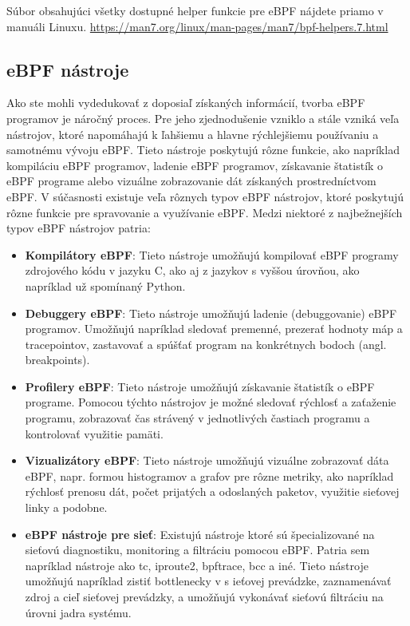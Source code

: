 Súbor obsahujúci všetky dostupné helper funkcie pre eBPF nájdete priamo v manuáli Linuxu. 
\url{https://man7.org/linux/man-pages/man7/bpf-helpers.7.html}

\subsection{eBPF nástroje}
Ako ste mohli vydedukovať z doposiaľ získaných informácií, tvorba eBPF programov je náročný proces. Pre jeho zjednodušenie vzniklo a 
stále vzniká veľa nástrojov, ktoré napomáhajú k ľahšiemu a hlavne rýchlejšiemu používaniu a samotnému vývoju eBPF. 
Tieto nástroje poskytujú rôzne funkcie, ako napríklad kompiláciu eBPF programov, ladenie eBPF programov, získavanie štatistík o eBPF 
programe alebo vizuálne zobrazovanie dát získaných prostredníctvom  eBPF. V súčasnosti existuje veľa rôznych typov eBPF nástrojov, 
ktoré poskytujú rôzne funkcie pre spravovanie a využívanie eBPF. 
Medzi niektoré z najbežnejších typov eBPF nástrojov patria:
\begin{itemize}
    \item \textbf{Kompilátory eBPF}: Tieto nástroje umožňujú kompilovať eBPF programy zdrojového kódu v jazyku C, ako aj z jazykov s vyššou úrovňou, 
    ako napríklad už spomínaný  Python.
    \item \textbf{Debuggery eBPF}: Tieto nástroje umožňujú ladenie (debuggovanie) eBPF programov. Umožňujú napríklad sledovať premenné, 
    prezerať hodnoty máp a tracepointov, zastavovať a spúšťať program na konkrétnych bodoch (angl. breakpoints).
    \item \textbf{Profilery eBPF}: Tieto nástroje umožňujú získavanie štatistík o eBPF programe. Pomocou týchto nástrojov je možné sledovať rýchlosť a 
    zaťaženie programu, zobrazovať čas strávený v jednotlivých častiach programu a kontrolovať využitie pamäti.
    \item \textbf{Vizualizátory eBPF}: Tieto nástroje umožňujú vizuálne zobrazovať dáta eBPF, napr. formou histogramov a grafov pre rôzne metriky, 
    ako napríklad rýchlosť prenosu dát, počet prijatých a odoslaných paketov, využitie sieťovej linky a podobne.
    \item \textbf{eBPF nástroje pre sieť}: Existujú nástroje ktoré sú špecializované na sieťovú diagnostiku, monitoring a filtráciu pomocou eBPF. 
    Patria sem napríklad nástroje ako tc, iproute2, bpftrace, bcc a iné. Tieto nástroje umožňujú napríklad zistiť bottlenecky v s
    ieťovej prevádzke, zaznamenávať zdroj a cieľ sieťovej prevádzky, a umožňujú vykonávať sieťovú filtráciu na úrovni jadra systému.
\end{itemize}

